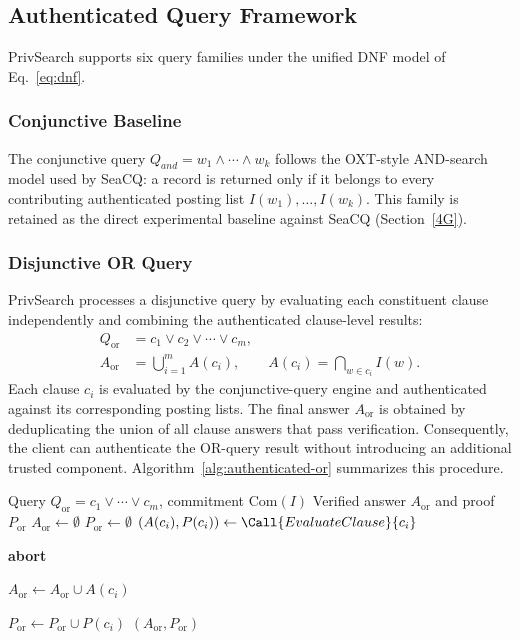 \subsection{Authenticated Query Framework}
\label{3C}
PrivSearch supports six query families under the unified DNF model of Eq.~\eqref{eq:dnf}.

\subsubsection{Conjunctive Baseline}
\label{3C1}
The conjunctive query $Q_{and}=w_1 \wedge \cdots \wedge w_k$ follows the OXT-style AND-search model used by SeaCQ: a record is returned only if it belongs to every contributing authenticated posting list $I(w_1),\dots,I(w_k)$. This family is retained as the direct experimental baseline against SeaCQ (Section~\ref{4G}).

\subsubsection{Disjunctive OR Query}
\label{sec:or-query}
PrivSearch processes a disjunctive query by evaluating each constituent
clause independently and combining the authenticated clause-level results:
\begin{equation}
\begin{aligned}
Q_{\mathrm{or}}
    &= c_1 \lor c_2 \lor \cdots \lor c_m,\\
A_{\mathrm{or}}
    &= \bigcup_{i=1}^{m} A(c_i),
    \qquad
A(c_i)=\bigcap_{w\in c_i} I(w).
\end{aligned}
\label{eq:qor}
\end{equation}
Each clause \(c_i\) is evaluated by the conjunctive-query engine and
authenticated against its corresponding posting lists. The final answer
\(A_{\mathrm{or}}\) is obtained by deduplicating the union of all clause
answers that pass verification. Consequently, the client can authenticate
the OR-query result without introducing an additional trusted component.
Algorithm~\ref{alg:authenticated-or} summarizes this procedure.

\begin{algorithm}[t]
\caption{Authenticated OR-Query Evaluation}
\label{alg:authenticated-or}
\begin{algorithmic}[1]
\Require Query $Q_{\mathrm{or}}=c_1\lor\cdots\lor c_m$,
commitment $\mathrm{Com}(I)$
\Ensure Verified answer $A_{\mathrm{or}}$ and proof $P_{\mathrm{or}}$
\State $A_{\mathrm{or}}\gets\emptyset$
\State $P_{\mathrm{or}}\gets\emptyset$
    \State $(A(c_i),P(c_i))
    \gets \Call{EvaluateClause}{c_i}$

        \State \textbf{abort}
    \EndIf

    \State $A_{\mathrm{or}}\gets
    A_{\mathrm{or}}\cup A(c_i)$

    \State $P_{\mathrm{or}}\gets
    P_{\mathrm{or}}\cup P(c_i)$
\EndFor
\State \Return $(A_{\mathrm{or}},P_{\mathrm{or}})$
\end{algorithmic}
\end{algorithm}

